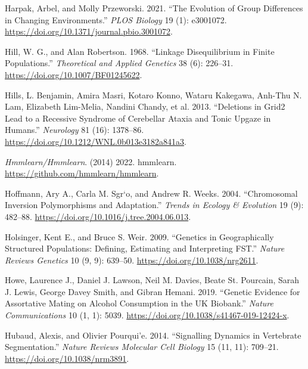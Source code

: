 \documentclass[
]{book}
\newlength{\cslhangindent}
\newlength{\cslentryspacingunit} %
\newenvironment{CSLReferences}[2] %
 {%
  \setlength{\parindent}{0pt}
  \ifodd #1
  \let\oldpar\par
  \def\par{\hangindent=\cslhangindent\oldpar}
  \fi
  \setlength{\parskip}{#2\cslentryspacingunit}
 }%
 {}
\begin{document}
\begin{CSLReferences}{1}{0}
\leavevmode{}%
Harpak, Arbel, and Molly Przeworski. 2021. {``The Evolution of Group Differences in Changing Environments.''} \emph{PLOS Biology} 19 (1): e3001072. \url{https://doi.org/10.1371/journal.pbio.3001072}.

\leavevmode{}%
Hill, W. G., and Alan Robertson. 1968. {``Linkage Disequilibrium in Finite Populations.''} \emph{Theoretical and Applied Genetics} 38 (6): 226--31. \url{https://doi.org/10.1007/BF01245622}.

\leavevmode{}%
Hills, L. Benjamin, Amira Masri, Kotaro Konno, Wataru Kakegawa, Anh-Thu N. Lam, Elizabeth Lim-Melia, Nandini Chandy, et al. 2013. {``Deletions in {Grid2} Lead to a Recessive Syndrome of Cerebellar Ataxia and Tonic Upgaze in Humans.''} \emph{Neurology} 81 (16): 1378--86. \url{https://doi.org/10.1212/WNL.0b013e3182a841a3}.

\leavevmode{}%
\emph{Hmmlearn/Hmmlearn}. (2014) 2022. {hmmlearn}. \url{https://github.com/hmmlearn/hmmlearn}.

\leavevmode{}%
Hoffmann, Ary A., Carla M. Sgr`o, and Andrew R. Weeks. 2004. {``Chromosomal Inversion Polymorphisms and Adaptation.''} \emph{Trends in Ecology \& Evolution} 19 (9): 482--88. \url{https://doi.org/10.1016/j.tree.2004.06.013}.

\leavevmode{}%
Holsinger, Kent E., and Bruce S. Weir. 2009. {``Genetics in Geographically Structured Populations: Defining, Estimating and Interpreting {FST}.''} \emph{Nature Reviews Genetics} 10 (9, 9): 639--50. \url{https://doi.org/10.1038/nrg2611}.

\leavevmode{}%
Howe, Laurence J., Daniel J. Lawson, Neil M. Davies, Beate St. Pourcain, Sarah J. Lewis, George Davey Smith, and Gibran Hemani. 2019. {``Genetic Evidence for Assortative Mating on Alcohol Consumption in the {UK Biobank}.''} \emph{Nature Communications} 10 (1, 1): 5039. \url{https://doi.org/10.1038/s41467-019-12424-x}.

\leavevmode{}%
Hubaud, Alexis, and Olivier Pourqui'e. 2014. {``Signalling Dynamics in Vertebrate Segmentation.''} \emph{Nature Reviews Molecular Cell Biology} 15 (11, 11): 709--21. \url{https://doi.org/10.1038/nrm3891}.


\end{CSLReferences}
\end{document}
